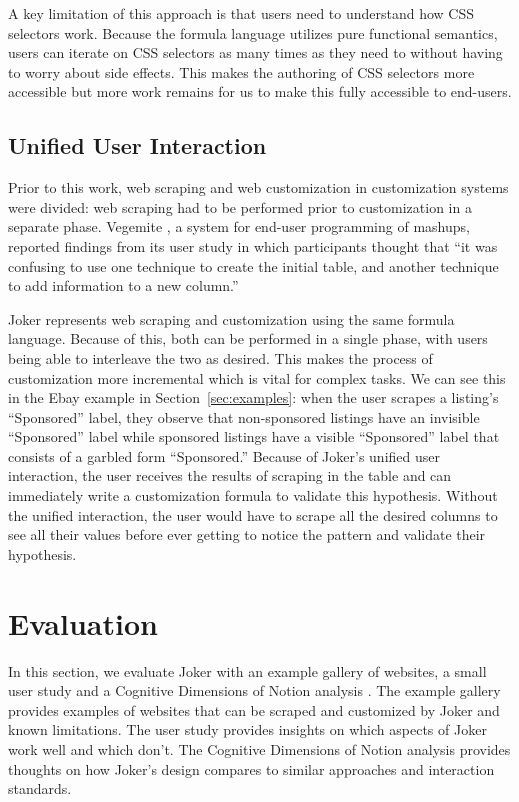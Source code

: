 \documentclass[sigconf,10pt]{acmart}
\begin{document}
A key limitation of this approach is that users need to understand how
CSS selectors work. Because the formula language utilizes pure
functional semantics, users can iterate on CSS selectors as many times
as they need to without having to worry about side effects. This makes
the authoring of CSS selectors more accessible but more work remains for
us to make this fully accessible to end-users.

\hypertarget{unified-user-interaction}{%
\subsection{Unified User Interaction}\label{unified-user-interaction}}

Prior to this work, web scraping and web customization in customization
systems \citep{huynh2006, lin2009} were divided: web scraping had to be
performed prior to customization in a separate phase. Vegemite
\citep{lin2009}, a system for end-user programming of mashups, reported
findings from its user study in which participants thought that ``it was
confusing to use one technique to create the initial table, and another
technique to add information to a new column.''

Joker represents web scraping and customization using the same formula
language. Because of this, both can be performed in a single phase, with
users being able to interleave the two as desired. This makes the
process of customization more incremental which is vital for complex
tasks. We can see this in the Ebay example in
Section~\ref{sec:examples}: when the user scrapes a listing's
``Sponsored'' label, they observe that non-sponsored listings have an
invisible ``Sponsored'' label while sponsored listings have a visible
``Sponsored'' label that consists of a garbled form ``Sponsored.''
Because of Joker's unified user interaction, the user receives the
results of scraping in the table and can immediately write a
customization formula to validate this hypothesis. Without the unified
interaction, the user would have to scrape all the desired columns to
see all their values before ever getting to notice the pattern and
validate their hypothesis.

\hypertarget{sec:evaluation}{%
\section{Evaluation}\label{sec:evaluation}}

In this section, we evaluate Joker with an example gallery of websites,
a small user study and a Cognitive Dimensions of Notion analysis
\citep{blackwell2001}. The example gallery provides examples of websites
that can be scraped and customized by Joker and known limitations. The
user study provides insights on which aspects of Joker work well and
which don't. The Cognitive Dimensions of Notion analysis provides
thoughts on how Joker's design compares to similar approaches and
interaction standards.
\end{document}
